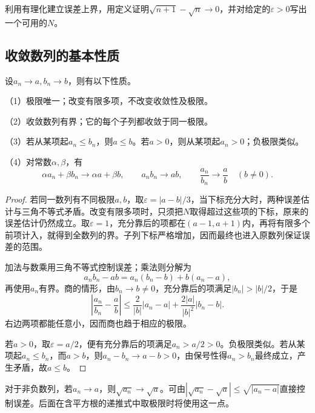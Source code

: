 \begin{example}
利用有理化建立误差上界，用定义证明\(\sqrt{n+1}-\sqrt n\to0\)，并对给定的\(\varepsilon>0\)写出一个可用的\(N\)。
\end{example}
\newpage
\subsection{收敛数列的基本性质}
\begin{theorem}\label{thm:analysis-sequence-limit-properties}
设\(a_n\to a,b_n\to b\)，则有以下性质。

（1）极限唯一；改变有限多项，不改变收敛性及极限。

（2）收敛数列有界；它的每个子列都收敛于同一极限。

（3）若从某项起\(a_n\le b_n\)，则\(a\le b\)。若\(a>0\)，则从某项起\(a_n>0\)；负极限类似。

（4）对常数\(\alpha,\beta\)，有
\begin{equation*}
 \alpha a_n+\beta b_n\to\alpha a+\beta b,\qquad
 a_nb_n\to ab,\qquad
 \frac{a_n}{b_n}\to\frac ab\quad(b\ne0).
\end{equation*}
\end{theorem}

\begin{proof}
若同一数列有不同极限\(a,b\)，取\(\varepsilon=|a-b|/3\)，当下标充分大时，两种误差估计与三角不等式矛盾。改变有限多项时，只须把\(N\)取得超过这些项的下标，原来的误差估计仍然成立。取\(\varepsilon=1\)，充分靠后的项都在\((a-1,a+1)\)内，再将有限多个前项计入，就得到全数列的界。子列下标严格增加，因而最终也进入原数列保证误差的范围。

加法与数乘用三角不等式控制误差；乘法则分解为
\begin{equation*}
 a_nb_n-ab=a_n(b_n-b)+b(a_n-a),
\end{equation*}
再使用\(a_n\)有界。商的情形，由\(b_n\to b\ne0\)，充分靠后的项满足\(|b_n|>|b|/2\)，于是
\begin{equation*}
 \left|\frac{a_n}{b_n}-\frac ab\right|
 \le\frac{2}{|b|}|a_n-a|+\frac{2|a|}{|b|^2}|b_n-b|.
\end{equation*}
右边两项都能任意小，因而商也趋于相应的极限。

若\(a>0\)，取\(\varepsilon=a/2\)，便有充分靠后的项满足\(a_n>a/2>0\)。负极限类似。若从某项起\(a_n\le b_n\)，而\(a>b\)，则\(a_n-b_n\to a-b>0\)，由保号性得\(a_n>b_n\)最终成立，产生矛盾，故\(a\le b\)。
\end{proof}

对于非负数列，若\(a_n\to a\)，则\(\sqrt{a_n}\to\sqrt a\)。可由\(|\sqrt{a_n}-\sqrt a|\le\sqrt{|a_n-a|}\)直接控制误差。后面在含平方根的递推式中取极限时将使用这一点。

